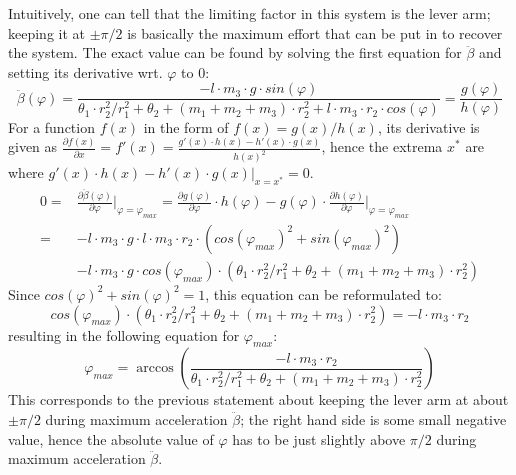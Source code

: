 \documentclass{article}
\begin{document}
Intuitively, one can tell that the limiting factor in this system is the lever arm; keeping it at $\pm \pi/2$ is basically the maximum effort that can be put in to recover the system.
The exact value can be found by solving the first equation for $\ddot{\beta}$ and setting its derivative wrt. $\varphi$ to 0:
\begin{equation}
\label{eq:beta_ddot_vs_phi}
\ddot{\beta}(\varphi) = \frac{-l \cdot m_3 \cdot g \cdot sin(\varphi)}{\theta_1 \cdot r_2^2/r_1^2 + \theta_2 + (m_1 + m_2 + m_3) \cdot r_2^2 + l \cdot m_3 \cdot r_2 \cdot cos(\varphi)} = \frac{g(\varphi)}{h(\varphi)}
\end{equation}
For a function $f(x)$ in the form of $f(x) = g(x)/h(x)$, its derivative is given as $\frac{\partial f(x)}{\partial x} = f'(x) = \frac{g'(x) \cdot h(x) - h'(x) \cdot g(x)}{h(x)^2}$, hence the extrema $x^*$ are where $g'(x) \cdot h(x) - h'(x) \cdot g(x) \Big|_{x=x^*} = 0$.
\begin{align*}
0 = {}& \frac{\partial \ddot{\beta}(\varphi)}{\partial \varphi} \Big|_{\varphi=\varphi_{max}} = \frac{\partial g(\varphi)}{\partial \varphi} \cdot h(\varphi) - g(\varphi) \cdot \frac{\partial h(\varphi)}{\partial \varphi} \Big|_{\varphi=\varphi_{max}} \\
= {}& -l \cdot m_3 \cdot g \cdot l \cdot m_3 \cdot r_2 \cdot \left(cos(\varphi_{max})^2 + sin(\varphi_{max})^2 \right) \\
{}& -l \cdot m_3 \cdot g \cdot cos(\varphi_{max}) \cdot \left(\theta_1 \cdot r_2^2/r_1^2 + \theta_2 + (m_1 + m_2 + m_3) \cdot r_2^2 \right)
\end{align*}
Since $cos(\varphi)^2 + sin(\varphi)^2 = 1$, this equation can be reformulated to:
\begin{equation*}
cos(\varphi_{max}) \cdot \left(\theta_1 \cdot r_2^2/r_1^2 + \theta_2 + (m_1 + m_2 + m_3) \cdot r_2^2 \right) = -l \cdot m_3 \cdot r_2
\end{equation*}
resulting in the following equation for $\varphi_{max}$:
\begin{equation}
\varphi_{max} = \arccos{ \left( \frac{-l \cdot m_3 \cdot r_2}{\theta_1 \cdot r_2^2/r_1^2 + \theta_2 + (m_1 + m_2 + m_3) \cdot r_2^2} \right) }
\label{eq:phi_max}
\end{equation}
This corresponds to the previous statement about keeping the lever arm at about $\pm \pi/2$ during maximum acceleration $\ddot{\beta}$;
the right hand side is some small negative value, hence the absolute value of $\varphi$ has to be just slightly above $\pi/2$ during maximum acceleration $\ddot{\beta}$.
\end{document}
